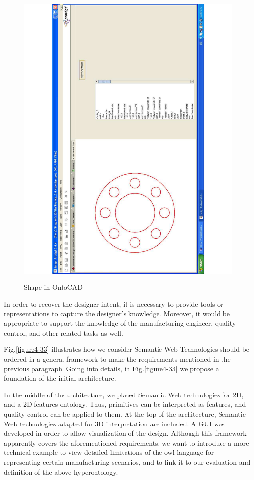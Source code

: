 \begin{figure}
\begin{minipage}{.5\textwidth}
		\includegraphics[scale=0.3, angle=270]{figure-chapterIV/fig432}\\
		\caption{Shape in OntoCAD}
		\label{figure4-32}
	\end{minipage}%
\end{figure}





In order to recover the designer intent, it is necessary to provide tools or representations to capture the designer’s knowledge. Moreover, it would be appropriate to support the knowledge of the manufacturing engineer, quality control, and other related tasks as well. 

Fig.\ref{figure4-33} illustrates how we consider Semantic Web Technologies should be ordered in a general framework to make the requirements mentioned in the previous paragraph. Going into details, in Fig.\ref{figure4-33} we propose a foundation of the initial architecture.

In the middle of the architecture, we placed Semantic Web technologies for 2D, and a 2D features ontology. Thus, primitives can be interpreted as features, and quality control can be applied to them. At the top of the architecture, Semantic Web technologies adapted for 3D interpretation are included. A GUI was developed in order to allow visualization of the design. Although this framework apparently covers the aforementioned requirements, we want to introduce a more technical example to view detailed limitations of  the \gls{owl}  language for representing certain manufacturing scenarios, and to link it to our evaluation and definition of the above hyperontology.



